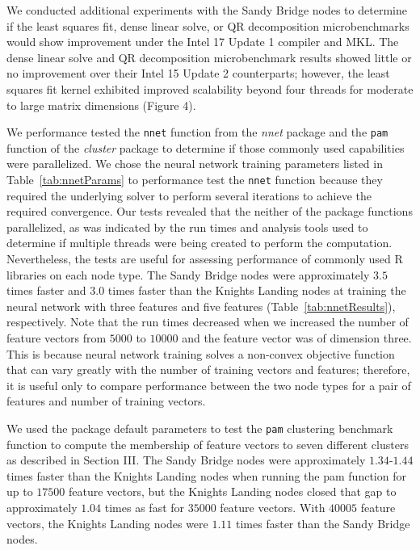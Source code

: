 We conducted additional experiments with the Sandy Bridge nodes to determine if
  the least squares fit, dense linear solve, or QR decomposition microbenchmarks
  would show improvement under the Intel 17 Update 1 compiler and MKL.
The dense linear solve and QR decomposition microbenchmark results showed little
  or no improvement over their Intel 15 Update 2 counterparts; however, the
  least squares fit kernel exhibited improved scalability beyond four threads
  for moderate to large matrix dimensions (Figure 4).

We performance tested the \texttt{nnet} function from the \textit{nnet} package
  and the \texttt{pam} function of the \textit{cluster} package to determine if
  those commonly used capabilities were parallelized.
We chose the neural network training parameters listed in Table~\ref{tab:nnetParams} to
  performance test the \texttt{nnet} function because they required the
  underlying solver to perform several iterations to achieve the required
  convergence.
Our tests revealed that the neither of the package functions parallelized, as
  was indicated by the run times and analysis tools used to determine if
  multiple threads were being created to perform the computation.
Nevertheless, the tests are useful for assessing performance of commonly used R
  libraries on each node type.
The Sandy Bridge nodes were approximately $3.5$ times faster and $3.0$ times
  faster than the Knights Landing nodes at training the neural network with
  three features and five features (Table~\ref{tab:nnetResults}), respectively.
Note that the run times decreased when we increased the number of feature
  vectors from $5000$ to $10000$ and the feature vector was of dimension three.
This is because neural network training solves a non-convex objective function
  that can vary greatly with the number of training vectors and features;
  therefore, it is useful only to compare performance between the two node types
  for a pair of features and number of training vectors.

We used the package default parameters to test the \texttt{pam} clustering
  benchmark function to compute the membership of feature vectors to seven
  different clusters as described in Section III.
The Sandy Bridge nodes were approximately $1.34$-$1.44$ times faster than the
  Knights Landing nodes when running the pam function for up to $17500$ feature
  vectors, but the Knights Landing nodes closed that gap to approximately $1.04$
  times as fast for $35000$ feature vectors.
With $40005$ feature vectors, the Knights Landing nodes were $1.11$ times faster
  than the Sandy Bridge nodes.

